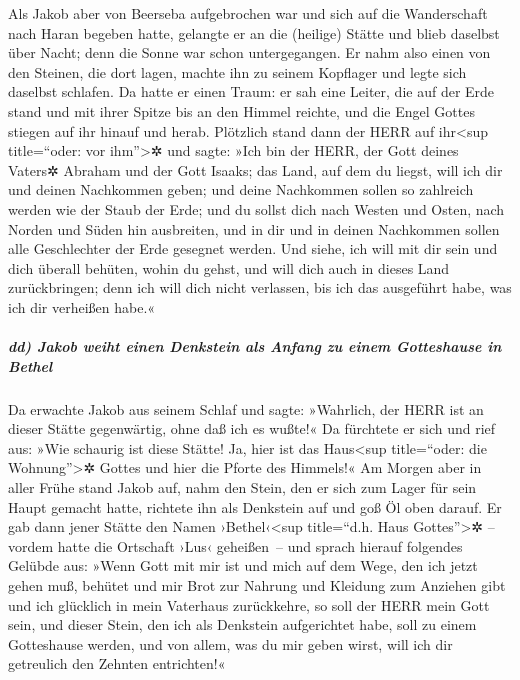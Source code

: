  Als Jakob aber von Beerseba aufgebrochen war und sich
auf die Wanderschaft nach Haran begeben hatte,  gelangte
er an die (heilige) Stätte und blieb daselbst über Nacht; denn die Sonne
war schon untergegangen. Er nahm also einen von den Steinen, die dort
lagen, machte ihn zu seinem Kopflager und legte sich daselbst schlafen.
 Da hatte er einen Traum: er sah eine Leiter, die auf der
Erde stand und mit ihrer Spitze bis an den Himmel reichte, und die Engel
Gottes stiegen auf ihr hinauf und herab.  Plötzlich stand
dann der HERR auf ihr\textless sup title=``oder: vor ihm''\textgreater✲
und sagte: »Ich bin der HERR, der Gott deines Vaters✲ Abraham und der
Gott Isaaks; das Land, auf dem du liegst, will ich dir und deinen
Nachkommen geben;  und deine Nachkommen sollen so
zahlreich werden wie der Staub der Erde; und du sollst dich nach Westen
und Osten, nach Norden und Süden hin ausbreiten, und in dir und in
deinen Nachkommen sollen alle Geschlechter der Erde gesegnet werden.
 Und siehe, ich will mit dir sein und dich überall
behüten, wohin du gehst, und will dich auch in dieses Land
zurückbringen; denn ich will dich nicht verlassen, bis ich das
ausgeführt habe, was ich dir verheißen habe.«

\hypertarget{dd-jakob-weiht-einen-denkstein-als-anfang-zu-einem-gotteshause-in-bethel}{%
\subparagraph{dd) Jakob weiht einen Denkstein als Anfang zu einem
Gotteshause in
Bethel}\label{dd-jakob-weiht-einen-denkstein-als-anfang-zu-einem-gotteshause-in-bethel}}

 Da erwachte Jakob aus seinem Schlaf und sagte:
»Wahrlich, der HERR ist an dieser Stätte gegenwärtig, ohne daß ich es
wußte!«  Da fürchtete er sich und rief aus: »Wie schaurig
ist diese Stätte! Ja, hier ist das Haus\textless sup title=``oder: die
Wohnung''\textgreater✲ Gottes und hier die Pforte des Himmels!«
 Am Morgen aber in aller Frühe stand Jakob auf, nahm den
Stein, den er sich zum Lager für sein Haupt gemacht hatte, richtete ihn
als Denkstein auf und goß Öl oben darauf.  Er gab dann
jener Stätte den Namen ›Bethel‹\textless sup title=``d.h. Haus
Gottes''\textgreater✲ -- vordem hatte die Ortschaft ›Lus‹ geheißen~--
 und sprach hierauf folgendes Gelübde aus: »Wenn Gott mit
mir ist und mich auf dem Wege, den ich jetzt gehen muß, behütet und mir
Brot zur Nahrung und Kleidung zum Anziehen gibt  und ich
glücklich in mein Vaterhaus zurückkehre, so soll der HERR mein Gott
sein,  und dieser Stein, den ich als Denkstein
aufgerichtet habe, soll zu einem Gotteshause werden, und von allem, was
du mir geben wirst, will ich dir getreulich den Zehnten entrichten!«

